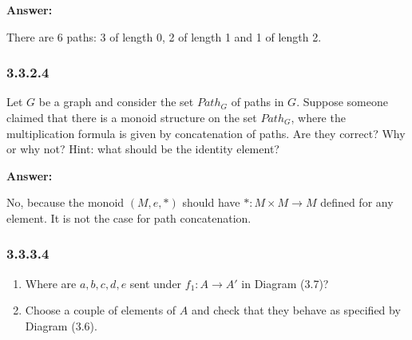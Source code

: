 \documentclass{article}
\newcommand{\vsp}[0]{\vspace*{10pt}\par}
\newcommand{\exercise}[1]{\subsubsection*{#1}}
\newcommand{\ans}[0]{\vsp\textbf{Answer: }\vsp}
\newcommand{\ei}{\item}
\newcommand{\es}{\begin{enumerate}[label=(\alph*)]\ei}
\newcommand{\ee}{\end{enumerate}}
\begin{document}
\ans

There are 6 paths: 3 of length 0, 2 of length 1 and 1 of length 2.

\exercise{3.3.2.4}

Let $G$ be a graph and consider the set $Path_G$ of paths in $G$. Suppose
someone claimed that there is a monoid structure on the set $Path_G$, where the
multiplication formula is given by concatenation of paths. Are they correct? Why
or why not? Hint: what should be the identity element?

\ans

No, because the monoid $(M,e,*)$ should have $*:M \times M\to M$ defined for any
element. It is not the case for path concatenation.

\exercise{3.3.3.4}

\es Where are $a, b, c, d, e$ sent under $f_1 : A \to A'$ in Diagram (3.7)?
\ei Choose a couple of elements of $A$ and check that they behave as specified
    by Diagram (3.6).
\ee


\vsp
\vsp
\vsp
\vsp

\printbibliography
\end{document}
